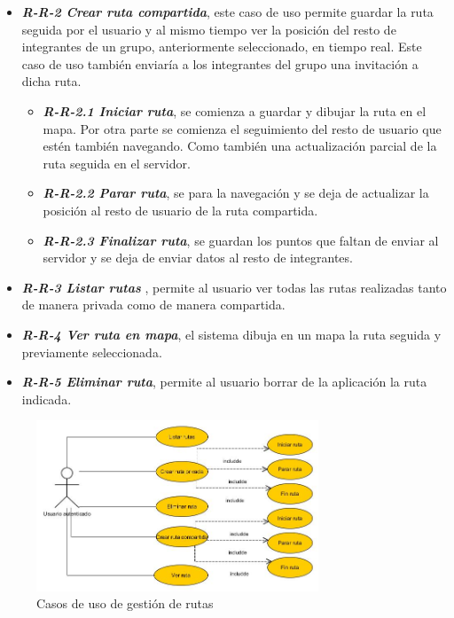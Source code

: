 \begin{itemize}
\begin{itemize}
\item \textbf{\textit{R-R-2 Crear ruta compartida}}, este caso de uso permite guardar la ruta seguida por el usuario y al mismo tiempo ver la posición del resto de integrantes de un grupo, anteriormente seleccionado, en tiempo real. Este caso de uso también enviaría a los integrantes del grupo una invitación a dicha ruta.
\begin{itemize}
\item \textbf{\textit{R-R-2.1 Iniciar ruta}}, se comienza a guardar y dibujar la ruta en el mapa. Por otra parte se comienza el seguimiento del resto de usuario que estén también navegando. Como también una actualización parcial de la ruta seguida en el servidor.
\item \textbf{\textit{R-R-2.2 Parar ruta}}, se para la navegación y se deja de actualizar la posición al resto de usuario de la ruta compartida.
\item \textbf{\textit{R-R-2.3 Finalizar ruta}}, se guardan los puntos que faltan de enviar al servidor y se deja de enviar datos al resto de integrantes.
\end{itemize}
\item \textbf{\textit{R-R-3 Listar rutas} }, permite al usuario ver todas las rutas realizadas tanto de manera privada como de manera compartida.
\item \textbf{\textit{R-R-4 Ver ruta en mapa}}, el sistema dibuja en un mapa la ruta seguida y previamente seleccionada.
\item \textbf{\textit{R-R-5 Eliminar ruta}}, permite al usuario borrar de la aplicación la ruta indicada.

\end{itemize} 
\end{itemize}
\begin{figure}[H]
		\centering
		\includegraphics[width=0.75\textwidth] {rutas.jpg}
		\caption{Casos de uso de gestión de rutas }
	\end{figure}

